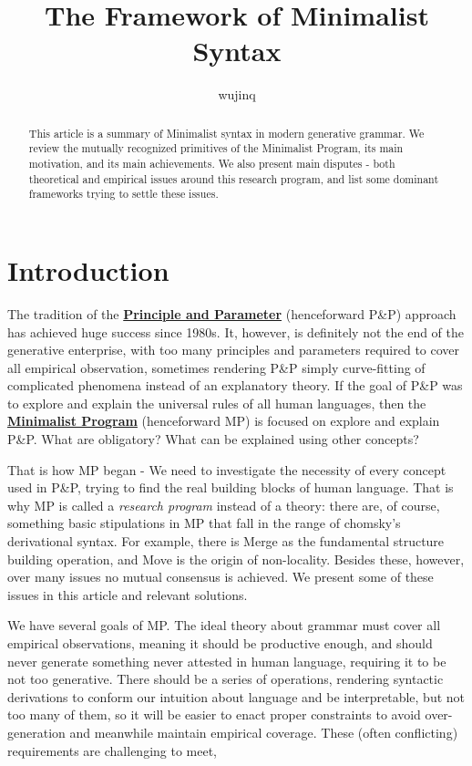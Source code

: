 \documentclass[a4paper]{article}
\title{The Framework of Minimalist Syntax}
\author{wujinq}
\newcommand*{\concept}[1]{\underline{\textbf{#1}}}
\begin{document}
\maketitle

\begin{abstract}
    This article is a summary of Minimalist syntax in modern generative grammar.
    We review the mutually recognized primitives of the Minimalist Program, its main motivation, and its main achievements.
    We also present main disputes - both theoretical and empirical issues around this research program, and list some dominant frameworks trying to settle these issues.  
\end{abstract}

\section{Introduction}

The tradition of the \concept{Principle and Parameter} (henceforward P\&P) approach has achieved huge success since 1980s. 
It, however, is definitely not the end of the generative enterprise, with too many principles and parameters required to cover all empirical observation, sometimes rendering P\&P simply curve-fitting of complicated phenomena instead of an explanatory theory.
If the goal of P\&P was to explore and explain the universal rules of all human languages, then the \concept{Minimalist Program} (henceforward MP) is focused on explore and explain P\&P.
What are obligatory? What can be explained using other concepts? 

That is how MP began - We need to investigate the necessity of every concept used in P\&P, trying to find the real building blocks of human language.
That is why MP is called a \emph{research program} instead of a theory: there are, of course, something basic stipulations in MP that fall in the range of chomsky's derivational syntax.
For example, there is Merge as the fundamental structure building operation, and Move is the origin of non-locality.
Besides these, however, over many issues no mutual consensus is achieved. We present some of these issues in this article and relevant solutions.

We have several goals of MP. The ideal theory about grammar must cover all empirical observations, meaning it should be productive enough, and should never generate something never attested in human language, requiring it to be not too generative.
There should be a series of operations, rendering syntactic derivations to conform our intuition about language and be interpretable, but not too many of them, so it will be easier to enact proper constraints to avoid over-generation and meanwhile maintain empirical coverage.
These (often conflicting) requirements are challenging to meet, 
\end{document}
